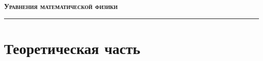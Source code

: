 \documentclass[12pt]{article}
\theoremstyle{plain}
\begin{document}
	
	\begin{center}
		\LARGE \bf	
		\textsc{Уравнения математической физики}
		\rule{\textwidth}{0.4pt}
	\end{center}
	
	\section{Теоретическая часть}
	
	 \newpage
	 \newpage
	 \newpage
	 \newpage
	 \newpage
	 \newpage
	 \newpage
	 \newpage
	 \newpage
	 \newpage
	 \newpage
	 \newpage
	 \newpage
	 \newpage
	 \newpage
	 \newpage
	 \newpage
	 \newpage
	 \newpage
	 \newpage
	 \newpage
	 \newpage
	 \newpage
	 \newpage
	 \newpage
	 \newpage
	 \newpage
	 \newpage
	 \newpage
	 \newpage
	 \newpage
	 \newpage
	 \newpage
	
\end{document}
